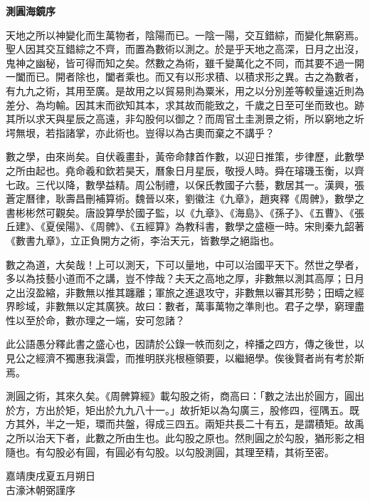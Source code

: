 \documentclass[11pt,a4paper]{article}
\newcommand{\huati}[1]{\noindent\textbf{\large #1}\par\medskip}
\begin{document}
\huati{測圓海鏡序}

天地之所以神變化而生萬物者，陰陽而已。一陰一陽，交互錯綜，而變化無窮焉。聖人因其交互錯綜之不齊，而置為數術以測之。於是乎天地之高深，日月之出沒，鬼神之幽秘，皆可得而知之矣。然數之為術，雖千變萬化之不同，而其要不過一開一闔而已。開者除也，闔者乘也。而又有以形求積、以積求形之異。古之為數者，有九九之術，其用至廣。是故用之以貿易則為粟米，用之以分別差等較量遠近則為差分、為均輸。因其末而欲知其本，求其故而能致之，千歲之日至可坐而致也。跡其所以求天與星辰之高遠，非勾股何以御之？而周官土圭測景之術，所以窮地之圻堮無垠，若指諸掌，亦此術也。豈得以為古奧而棄之不講乎？

數之學，由來尚矣。自伏羲畫卦，黃帝命隸首作數，以迎日推策，步律歷，此數學之所由起也。堯命羲和欽若昊天，曆象日月星辰，敬授人時。舜在璿璣玉衡，以齊七政。三代以降，數學益精。周公制禮，以保氏教國子六藝，數居其一。漢興，張蒼定曆律，耿壽昌刪補算術。魏晉以來，劉徽注《九章》，趙爽釋《周髀》，數學之書彬彬然可觀矣。唐設算學於國子監，以《九章》、《海島》、《孫子》、《五曹》、《張丘建》、《夏侯陽》、《周髀》、《五經算》為教科書，數學之盛極一時。宋則秦九韶著《數書九章》，立正負開方之術，李治天元，皆數學之絕詣也。

數之為道，大矣哉！上可以測天，下可以量地，中可以治國平天下。然世之學者，多以為技藝小道而不之講，豈不悖哉？夫天之高地之厚，非數無以測其高厚；日月之出沒盈縮，非數無以推其躔離；軍旅之進退攻守，非數無以審其形勢；田疇之經界畛域，非數無以定其廣狹。故曰：數者，萬事萬物之準則也。君子之學，窮理盡性以至於命，數亦理之一端，安可忽諸？

此公語愚分釋此書之盛心也，因請於公錄一帙而刻之，梓播之四方，傳之後世，以見公之經濟不獨惠我滇雲，而推明朕兆根極領要，以繼絕學。俟後賢者尚有考於斯焉。

測圓之術，其來久矣。《周髀算經》載勾股之術，商高曰：「數之法出於圓方，圓出於方，方出於矩，矩出於九九八十一。」故折矩以為勾廣三，股修四，徑隅五。既方其外，半之一矩，環而共盤，得成三四五。兩矩共長二十有五，是謂積矩。故禹之所以治天下者，此數之所由生也。此勾股之原也。然則圓之於勾股，猶形影之相隨也。有勾股必有圓，有圓必有勾股。以勾股測圓，其理至精，其術至密。

\begin{flushright}
嘉靖庚戌夏五月朔日\\
古濠沐朝弼謹序
\end{flushright}

\clearpage


\end{document}
